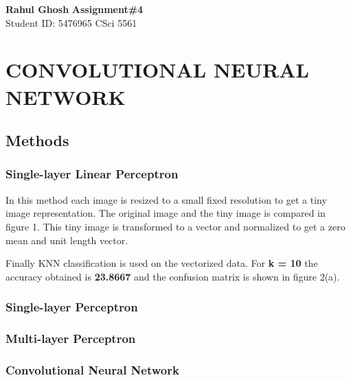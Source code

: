 \documentclass[letter, 11pt]{article}
\begin{document}
\noindent
\large \textbf{Rahul Ghosh} \hfill \textbf{Assignment\#4}\\
\normalsize Student ID: 5476965 \hfill CSci 5561\\


\section*{\centering CONVOLUTIONAL NEURAL NETWORK}

\subsection*{Methods}
\subsubsection*{Single-layer Linear Perceptron}
In this method each image is resized to a small fixed resolution to get a tiny image representation. The original image and the tiny image is compared in figure 1. This tiny image is transformed to a vector and normalized to get a zero mean and unit length vector. 

Finally KNN classification is used on the vectorized data. For \textbf{k = 10} the accuracy obtained is \textbf{23.8667} and the confusion matrix is shown in figure 2(a).

\subsubsection*{Single-layer Perceptron}
\subsubsection*{Multi-layer Perceptron}
\subsubsection*{Convolutional Neural Network}
\end{document}
